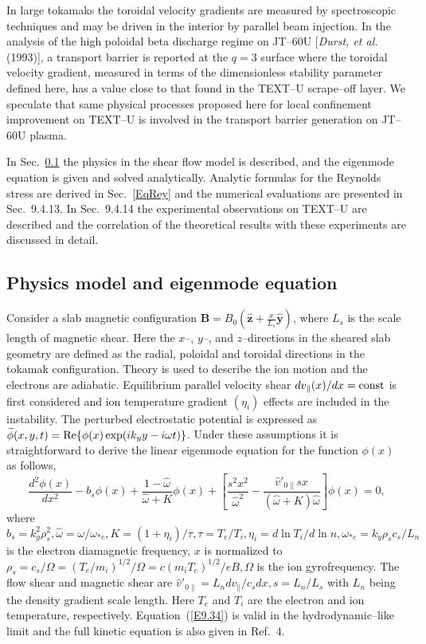 \documentclass[a4paper,openany,12pt]{book}
\begin{document}
{In large tokamaks the toroidal velocity gradients are measured by spectroscopic techniques and may be driven in the interior by parallel beam injection. In the analysis of the high poloidal beta discharge regime on JT--60U [\emph{Durst, et al.} (1993)], a transport barrier is reported at the $q=3$ surface where the toroidal velocity gradient, measured in terms of the dimensionless stability parameter defined here, has a value close to that found in the TEXT--U scrape--off  layer. We speculate that same physical processes proposed here for local confinement improvement on TEXT--U is involved in the transport barrier generation on JT--60U plasma.

In Sec.~\ref{phys-model} the physics in the shear flow model is described, and the eigenmode equation is given and solved analytically. Analytic formulas for the Reynolds stress are derived in Sec.~\ref{EqRey} and the numerical evaluations are presented in Sec.~9.4.13. In Sec.~9.4.14 the experimental observations on TEXT--U are described and the correlation of the theoretical results with these experiments are discussed in detail.

\subsection{Physics model and eigenmode equation}
\label{phys-model}

Consider a slab magnetic configuration $\bm{B}=B_0(\widehat{\bm{z}}+\frac{x}{L_s}\widehat{\bm{y}})$, where $L_s$ is the scale length of magnetic shear. Here the $x$--, $y$--, and $z$--directions in the sheared slab geometry are defined as the radial, poloidal and toroidal directions in the tokamak configuration. Theory is used to describe the ion motion and the electrons are adiabatic. Equilibrium parallel velocity shear $dv_\|(x)/dx=\rm const$ is first considered and ion temperature gradient $(\eta_i)$ effects are included in the instability. The perturbed electrostatic potential is expressed as $\widetilde\phi(x, y, t)={\rm Re}\{\phi(x)\exp(ik_y y-i\omega t)\}$. Under these assumptions it is straightforward to derive the linear eigenmode equation for the function $\phi(x)$ as follows,
\begin{equation}
\frac{d^2\phi(x)}{dx^2}-b_s\phi(x)+\frac{1-\widehat\omega}{\widehat\omega+K}\phi(x)+\left[\frac{s^2x^2}{\widehat\omega^2}-\frac{\widehat v'_{0\|}sx}{(\widehat\omega+K)\widehat\omega}\right]\phi(x)=0,\label{E9.34}
\end{equation}
where $b_s=k_y^2\rho_s^2,\widehat\omega=\omega/\omega_{*e}, K=(1+\eta_i)/\tau, \tau=T_e/T_i, \eta_i=d\ln T_i/d\ln n, \omega_{*e}=k_y\rho_sc_s/L_n$ is the electron diamagnetic frequency, $x$ is normalized to $\rho_s=c_s/\Omega=(T_e/m_i)^{1/2}/\Omega=c(m_iT_e)^{1/2}/eB, \Omega$ is the ion gyrofrequency. The flow shear and magnetic shear are
$\widehat v'_{0\|}=L_ndv_\|/c_s dx, s=L_n/L_s$ with $L_n$ being the density gradient scale length. Here $T_e$ and $T_i$ are the electron and ion temperature, respectively. Equation~(\ref{E9.34}) is valid in the hydrodynamic--like limit and the full kinetic equation is also given in Ref.~4.

}
\end{document}

